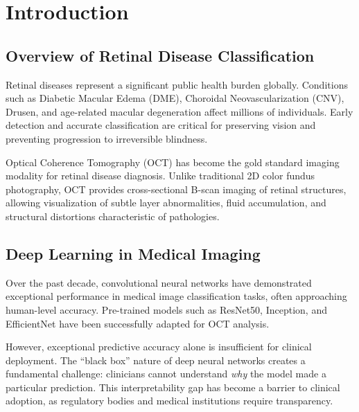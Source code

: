 \documentclass[12pt,a4paper,oneside]{book}
\begin{document}
\tableofcontents
\newpage

\chapter{Introduction}
\label{ch:introduction}

\section{Overview of Retinal Disease Classification}

Retinal diseases represent a significant public health burden globally. Conditions such as Diabetic Macular Edema (DME), Choroidal Neovascularization (CNV), Drusen, and age-related macular degeneration affect millions of individuals. Early detection and accurate classification are critical for preserving vision and preventing progression to irreversible blindness.

Optical Coherence Tomography (OCT) has become the gold standard imaging modality for retinal disease diagnosis. Unlike traditional 2D color fundus photography, OCT provides cross-sectional B-scan imaging of retinal structures, allowing visualization of subtle layer abnormalities, fluid accumulation, and structural distortions characteristic of pathologies.

\section{Deep Learning in Medical Imaging}

Over the past decade, convolutional neural networks have demonstrated exceptional performance in medical image classification tasks, often approaching human-level accuracy. Pre-trained models such as ResNet50, Inception, and EfficientNet have been successfully adapted for OCT analysis.

However, exceptional predictive accuracy alone is insufficient for clinical deployment. The ``black box'' nature of deep neural networks creates a fundamental challenge: clinicians cannot understand \textit{why} the model made a particular prediction. This interpretability gap has become a barrier to clinical adoption, as regulatory bodies and medical institutions require transparency.
\end{document}
